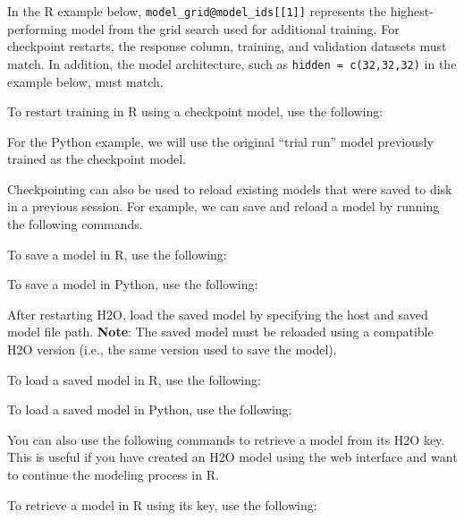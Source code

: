 {{In the R example below, \texttt{model\_grid@model\_ids[[1]]} represents the highest-performing model from the grid search used for additional training. For checkpoint restarts, the response column, training, and validation datasets must match.  In addition, the model architecture, such as \texttt{hidden = c(32,32,32)} in the example below, must match.

\waterExampleInR
To restart training in R using a checkpoint model, use the following: 


\newpage
\waterExampleInPython
For the Python example, we will use the original ``trial run'' model previously trained as the checkpoint model.
\medskip


\noindent
Checkpointing can also be used to reload existing models that were saved to disk in a previous session. For example, we can save and reload a model by running the following commands.

\waterExampleInR
To save a model in R, use the following: 
\medskip

\newpage
\waterExampleInPython
To save a model in Python, use the following: 
\medskip



\normalsize

\noindent
After restarting  H2O, load the saved model by specifying the host and saved model file path. \textbf{Note}: The saved model must be reloaded using a compatible H2O version (i.e., the same version used to save the model).

\normalsize
\waterExampleInR
To load a saved model in R, use the following: 


\waterExampleInPython
To load a saved model in Python, use the following: 



\noindent
You can also use the following commands to retrieve a model from its H2O key. This is useful if you have created an H2O model using the web interface and want to continue the modeling process in R.

\waterExampleInR
To retrieve a model in R using its key, use the following: 


}}
